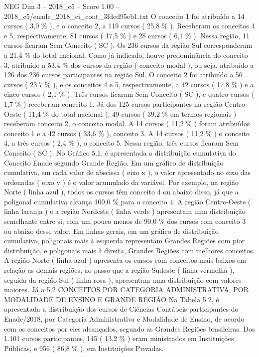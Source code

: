 \begin{textsample}{NEG Dim 3 – 2018\_c5 – Score 1.00 – 2018\_c5/enade\_2018\_ci\_cont\_3fded95eb1.txt}
O conceito 1 foi atribuído a 14 cursos ( 3,0 \% ), e o conceito 2, a 119 cursos ( 25,8 \% ).
Receberam os conceitos 4 e 5, respectivamente, 81 cursos ( 17,5 \% ) e 28 cursos ( 6,1 \% ).
Nessa região, 11 cursos ficaram Sem Conceito ( SC ).
Os 236 cursos da região Sul corresponderam a 21,4 \% do total nacional.
Como já indicado, houve predominância do conceito 3, atribuído a 53,4 \% dos cursos da região ( conceito modal ), ou seja, atribuído a 126 dos 236 cursos participantes na região Sul.
O conceito 2 foi atribuído a 56 cursos ( 23,7 \% ), e os conceitos 4 e 5, respectivamente, a 42 cursos ( 17,8 \% ) e a cinco cursos ( 2,1 \% ).
Três cursos ficaram Sem Conceito ( SC ), e quatro cursos ( 1,7 \% ) receberam conceito 1.
Já dos 125 cursos participantes na região Centro-Oeste ( 11,4 \% do total nacional ), 49 cursos ( 39,2 \% em termos regionais ) receberam conceito 2, o conceito modal.
A 14 cursos ( 11,2 \% ) foram atribuídos conceito 1 e a 42 cursos ( 33,6 \% ), conceito 3.
A 14 cursos ( 11,2 \% ) o conceito 4, a três cursos ( 2,4 \% ), o conceito 5.
Nessa região, três cursos ficaram Sem Conceito ( SC ).
No Gráfico 5.1, é apresentada a distribuição cumulativa do Conceito Enade segundo Grande Região.
Em um gráfico de distribuição cumulativa, em cada valor de abscissa ( eixo x ), o valor apresentado no eixo das ordenadas ( eixo y ) é o valor acumulado da variável.
Por exemplo, na região Norte ( linha azul ), todos os cursos têm conceito 4 ou abaixo disso, já que a poligonal cumulativa alcança 100,0 \% para o conceito 4.
A região Centro-Oeste ( linha laranja ) e a região Nordeste ( linha verde ) apresentam uma distribuição semelhante entre si, com um pouco menos de 90,0 \% dos cursos com conceito 3 ou abaixo desse valor.
Em linhas gerais, em um gráfico de distribuição cumulativa, poligonais mais à esquerda representam Grandes Regiões com pior distribuição, e poligonais mais à direita, Grandes Regiões com melhores conceitos.
A região Norte ( linha azul ) apresenta os cursos com conceitos mais baixos em relação as demais regiões, ao passo que a região Sudeste ( linha vermelha ), seguida da região Sul ( linha rosa ), apresentam uma distribuição com valores maiores.
Já a 5.2 CONCEITOS POR CATEGORIA ADMINISTRATIVA, POR MODALIDADE DE ENSINO E GRANDE REGIÃO Na Tabela 5.2, é apresentada a distribuição dos cursos de Ciências Contábeis participantes do Enade/2018, por Categoria Administrativa e Modalidade de Ensino, de acordo com os conceitos por eles alcançados, segundo as Grandes Regiões brasileiras.
Dos 1.101 cursos participantes, 145 ( 13,2 \% ) eram ministrados em Instituições Públicas, e 956 ( 86,8 \% ), em Instituições Privadas.

\end{textsample}
